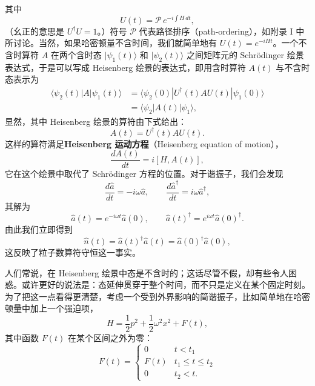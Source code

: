 其中
\begin{equation*}
U(t) = \mathcal{P}\, e^{-i\int H\,dt},
\tag{9.34}
\end{equation*}
（幺正的意思是 $U^{\dagger}U = 1$。）符号 $\mathcal{P}$ 代表路径排序（path-ordering），如附录 I 中所讨论。当然，如果哈密顿量不含时间，我们就简单地有 $U(t) = e^{-iHt}$。一个不含时算符 $A$ 在两个含时态 $|\psi_1(t)\rangle$ 和 $|\psi_2(t)\rangle$ 之间矩阵元的 Schrödinger 绘景表达式，于是可以写成 Heisenberg 绘景的表达式，即用含时算符 $A(t)$ 与不含时态表示为
\begin{align*}
\langle\psi_2(t)|A|\psi_1(t)\rangle &= \langle\psi_2(0)|U^{\dagger}(t)AU(t)|\psi_1(0)\rangle \\
&= \langle\psi_2|A(t)|\psi_1\rangle,
\tag{9.35}
\end{align*}
显然，其中 Heisenberg 绘景的算符由下式给出：
\begin{equation*}
A(t) = U^{\dagger}(t)AU(t).
\tag{9.36}
\end{equation*}
这样的算符满足\textbf{Heisenberg 运动方程}（Heisenberg equation of motion），
\begin{equation*}
\frac{dA(t)}{dt} = i[H, A(t)],
\tag{9.37}
\end{equation*}
它在这个绘景中取代了 Schrödinger 方程的位置。对于谐振子，我们会发现
\begin{equation*}
\frac{d\hat{a}}{dt} = -i\omega\hat{a}, \qquad \frac{d\hat{a}^{\dagger}}{dt} = i\omega\hat{a}^{\dagger},
\tag{9.38}
\end{equation*}
其解为
\begin{equation*}
\hat{a}(t) = e^{-i\omega t}\hat{a}(0), \qquad \hat{a}(t)^{\dagger} = e^{i\omega t}\hat{a}(0)^{\dagger}.
\tag{9.39}
\end{equation*}
由此我们立即得到
\begin{equation*}
\hat{n}(t) = \hat{a}(t)^{\dagger}\hat{a}(t) = \hat{a}(0)^{\dagger}\hat{a}(0),
\tag{9.40}
\end{equation*}
这反映了粒子数算符守恒这一事实。

人们常说，在 Heisenberg 绘景中态是不含时的；这话尽管不假，却有些令人困惑。或许更好的说法是：态延伸贯穿于整个时间，而不只是定义在某个固定时刻。为了把这一点看得更清楚，考虑一个受到外界影响的简谐振子，比如简单地在哈密顿量中加上一个强迫项，
\begin{equation*}
H = \frac{1}{2}p^2 + \frac{1}{2}\omega^2 x^2 + F(t),
\tag{9.41}
\end{equation*}
其中函数 $F(t)$ 在某个区间之外为零：
\begin{equation*}
F(t) =
\begin{cases}
0 & t < t_1 \\
F(t) & t_1 \leq t \leq t_2 \\
0 & t_2 < t .
\end{cases}
\tag{9.42}
\end{equation*}

